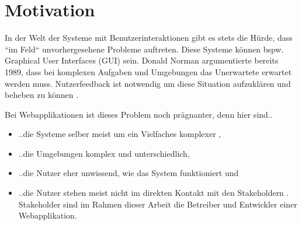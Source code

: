 \section{Motivation}


In der Welt der Systeme mit Benutzerinteraktionen gibt es stets die Hürde, dass ``im Feld`` unvorhergesehene Probleme auftreten. Diese Systeme können bspw. Graphical User Interfaces (GUI) sein. Donald Norman \cite{TheProblemOfAutomation} argumentierte bereits 1989, dass bei komplexen Aufgaben und Umgebungen das Unerwartete erwartet werden muss. Nutzerfeedback ist notwendig um diese Situation aufzuklären und beheben zu können \cite{AnErrorReportingAndFeedbackComponent}.

Bei Webapplikationen ist dieses Problem noch prägnanter, denn hier sind..
\begin{itemize}
	\item ..die Systeme selber meist um ein Vielfaches komplexer \cite{ManagingTheComplexityOfWebSystemsDevelopment},
	\item ..die Umgebungen komplex und unterschiedlich,
	\item ..die Nutzer eher unwissend, wie das System funktioniert \cite{AnErrorReportingAndFeedbackComponent} und
	\item ..die Nutzer stehen meist nicht im direkten Kontakt mit den Stakeholdern \cite{EndUsersAsUnwittingSoftwareDevelopers}. Stakeholder sind im Rahmen dieser Arbeit die Betreiber und Entwickler einer Webapplikation.
\end{itemize}


